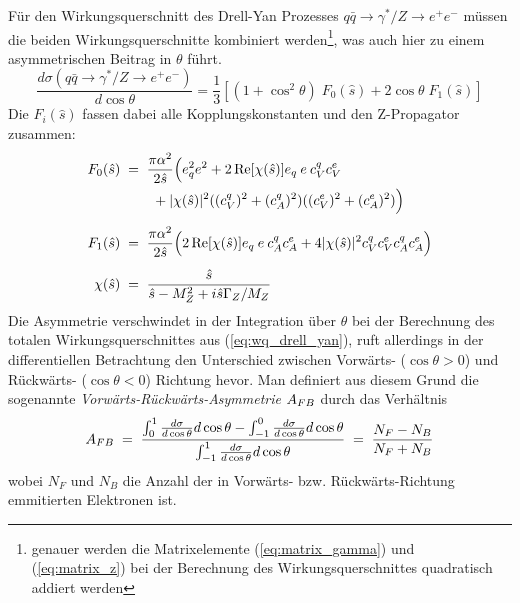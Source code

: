 Für den Wirkungsquerschnitt des Drell-Yan Prozesses $q\bar q \rightarrow
\gamma^*/Z \rightarrow e^+e^-$ müssen die beiden Wirkungsquerschnitte
kombiniert werden\footnote{genauer werden die Matrixelemente
(\ref{eq:matrix_gamma}) und (\ref{eq:matrix_z}) bei der Berechnung des
Wirkungsquerschnittes quadratisch addiert werden}, was auch hier zu einem 
asymmetrischen Beitrag in $\theta$ führt.
\begin{equation}
    \frac{d\sigma(q\bar q\rightarrow\gamma^*/Z\rightarrow e^+e^-)}{d\cos\theta}
        = \frac{1}{3}
          \left[
              (1+\cos^2\theta) \; F_0(\hat s)
              + 2\cos\theta \; F_1(\hat s)
          \right]
    \label{eq:wq_drell_yan}
\end{equation}
Die $F_i(\hat s)$ fassen dabei alle Kopplungskonstanten und den Z-Propagator
zusammen:
\begin{align}
    F_0(\hat s) \; &= \;
        \frac{\pi \alpha^2}{2 \hat s}
        \Bigl(
            e_q^2 e^2 + 2 \operatorname{Re}[\chi(\hat s)] e_q \:e\: c_V^q c_V^e
            \nonumber \\ & \qquad
            + |\chi(\hat s)|^2 ((c_V^q)^2+(c_A^q)^2)((c_V^e)^2+(c_A^e)^2)
        \Bigr)
        \\[5pt]
    F_1(\hat s) \; &= \;
        \frac{\pi \alpha^2}{2 \hat s}
        \Bigl(
            2\operatorname{Re}[\chi(\hat s)] e_q \:e\: c_A^q c_A^e
            + 4|\chi(\hat s)|^2 c_V^q c_V^e c_A^q c_A^e
        \Bigr)
        \\[5pt]
    \chi(\hat s) \; &= \;
        \frac{\hat s}{\hat s - M_Z^2 + i\hat s \Gamma_Z/M_Z}
\end{align}
Die Asymmetrie verschwindet in der Integration über $\theta$ bei der
Berechnung des totalen Wirkungsquerschnittes aus (\ref{eq:wq_drell_yan}), ruft
allerdings in der differentiellen Betrachtung den Unterschied zwischen
Vorwärts- ($\cos\theta > 0$) und Rückwärts- ($\cos\theta < 0$) Richtung hevor. 
Man definiert aus diesem Grund die sogenannte
\textit{Vorwärts-Rückwärts-Asymmetrie} $A_{FB}$ durch das Verhältnis
\begin{equation}
    A_{FB} \;=\; \frac{ \int_0^1    \frac{d\sigma}{d\cos\theta} d\cos\theta
                    - \int_{-1}^0 \frac{d\sigma}{d\cos\theta} d\cos\theta
                    }{\int_{-1}^1 \frac{d\sigma}{d\cos\theta} d\cos\theta}
         \;=\; \frac{N_F - N_B}{N_F + N_B}
    \label{eq:afb}
\end{equation}
wobei $N_F$ und $N_B$ die Anzahl der in Vorwärts- bzw. Rückwärts-Richtung
emmitierten Elektronen ist.



